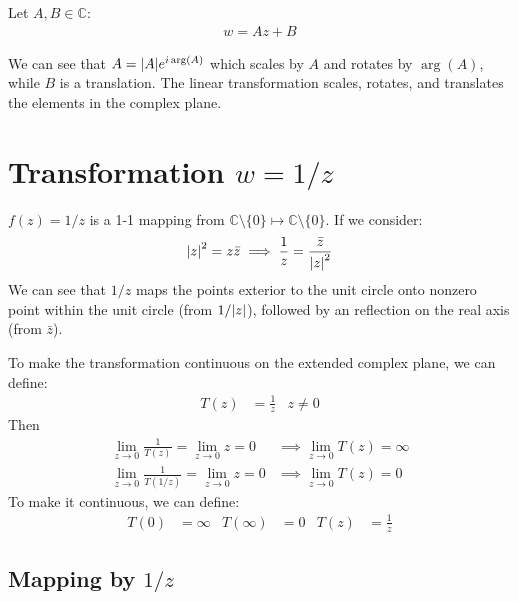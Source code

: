 \documentclass[12pt, english]{book}
\begin{document}
	\begin{definition}
		\label{Linear Transformation Definition - Complex}
		Let \(A, B \in \mathbb{C}\):
		\begin{align*}
			w = Az + B
		\end{align*}
	\end{definition}
	
	We can see that \(A = \abs{A}e^{i\arg(A)}\) which scales by \(A\) and rotates by \(\arg(A)\), while \(B\) is a translation. The linear transformation scales, rotates, and translates the elements in the complex plane.
	
	\section{Transformation \texorpdfstring{\(w = 1/z\)}{TEXT}} \label{Transformation w=1/z Section - Complex}
	
	\(f(z) = 1/z\) is a 1-1 mapping from \(\mathbb{C}\setminus\{0\} \mapsto \mathbb{C}\setminus\{0\}\). If we consider:
	\begin{align*}
		\abs{z}^2 = z \bar{z} \implies \frac{1}{z} = \frac{\bar{z}}{\abs{z}^2}
	\end{align*}
	We can see that \(1/z\) maps the points exterior to the unit circle onto nonzero point within the unit circle (from \(1/\abs{z}\)), followed by an reflection on the real axis (from \(\bar{z}\)).
	
	To make the transformation continuous on the extended complex plane, we can define:
	\begin{align*}
		T(z) &= \frac{1}{z}	& z \neq 0
	\end{align*} 
	Then 
	\begin{align*}
		\lim_{z \rightarrow 0} \frac{1}{T(z)} = \lim_{z \rightarrow 0} z = 0
			&\implies \lim_{z \rightarrow 0} T(z) = \infty \\
		\lim_{z \rightarrow 0} \frac{1}{T(1/z)} = \lim_{z \rightarrow 0} z = 0
		&\implies \lim_{z \rightarrow 0} T(z) = 0 
	\end{align*}
	To make it continuous, we can define:
	\begin{align*}
		T(0) &= \infty	&
		T(\infty) &= 0	&
		T(z) &= \frac{1}{z}
	\end{align*}
	
	\subsection{Mapping by \texorpdfstring{\(1/z\)}{TEXT}} \label{Mapping by 1/z Subsection - Complex}
	
\end{document}
